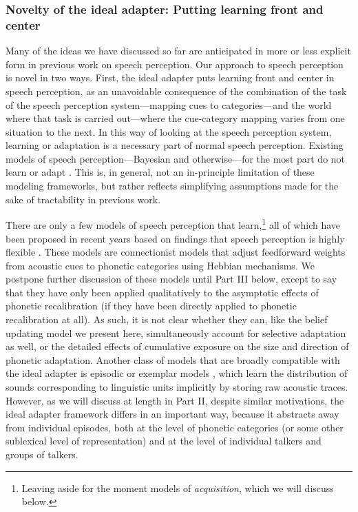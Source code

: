 \subsubsection{Novelty of the ideal adapter: Putting learning front and center}
\label{sec:novelty-ideal-adapt}
\label{r2-part1-novelty}

Many of the ideas we have discussed so far are anticipated in more or less explicit form in previous work on speech perception.  Our approach to speech perception is novel in two ways.  First, the ideal adapter puts learning front and center in speech perception, as an unavoidable consequence of the combination of the task of the speech perception system---mapping cues to categories---and the world where that task is carried out---where the cue-category mapping varies from one situation to the next.  In this way of looking at the speech perception system, learning or adaptation is a necessary part of normal speech perception.  Existing models of speech perception---Bayesian and otherwise---for the most part do not learn or adapt \autocite{Clayards2008,Feldman2009a,McClelland1986,Norris1994,Norris2000}.  This is, in general, not an in-principle limitation of these modeling frameworks, but rather reflects simplifying assumptions made for the sake of tractability in previous work.  

There are only a few models of speech perception that learn,\footnote{Leaving aside for the moment models of \emph{acquisition}, which we will discuss below.} all of which have been proposed in recent years based on findings that speech perception is highly flexible \autocite{Lancia2013,Mirman2006}.  These models are connectionist models that adjust feedforward weights from acoustic cues to phonetic categories using Hebbian mechanisms.  
We postpone further discussion of these models until Part III below, except to say that they have only been applied qualitatively to the asymptotic effects of phonetic recalibration (if they have been directly applied to phonetic recalibration at all).  As such, it is not clear whether they can, like the belief updating model we present here, simultaneously account for selective adaptation as well, or the detailed effects of cumulative exposure on the size and direction of phonetic adaptation.  Another class of models that are broadly compatible with the ideal adapter is episodic or exemplar models \autocite[e.g.,][]{Johnson1997a,Goldinger1998,Pierrehumbert2003}, which learn the distribution of sounds corresponding to linguistic units implicitly by storing raw acoustic traces.  However, as we will discuss at length in Part II, despite similar motivations, the ideal adapter framework differs in an important way, because it abstracts away from individual episodes, both at the level of phonetic categories (or some other sublexical level of representation) and at the level of individual talkers and groups of talkers.

